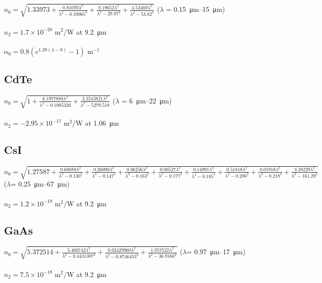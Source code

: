 \documentclass{report}
\begin{document}
\begin{appendices}
\subsection*{}
$n_0=\sqrt{1.33973+\frac{0.81070\lambda^2}{\lambda^2-0.10065^2}+\frac{0.19652\lambda^2}{\lambda^2-29.87^2}+\frac{4.52469\lambda^2}{\lambda^2-53.82^2}}$ (\(\lambda\) = \SIrange{0.15}{15}{\micro\meter}) \cite{Li-1980}\\
\\
$n_2 = 1.7\times 10^{-20}$ m$^2$/W at \SI{9.2}{\micro\meter} \cite{Polyanskiy-2021b}\\
\\
$\alpha_0 = 0.8 (e^{1.20(\lambda-8)}-1)$ m$^{-1}$ \cite{Polyanskiy-2023}

\subsection*{CdTe}
$n_0=\sqrt{1+\frac{6.1977889\lambda^2}{\lambda^2-0.1005326}+\frac{3.2243821\lambda^2}{\lambda^2-5279.518}}$ (\(\lambda\) = \SIrange{6}{22}{\micro\meter}) \cite{DeBell-1979}\\
\\
$n_2 = -2.95\times 10^{-17}$ m$^2$/W at \SI{1.06}{\micro\meter} \cite{Sheik-Bahae-1991}

\subsection*{CsI}
$n_0=\sqrt{1.27587+\frac{0.68689\lambda^2}{\lambda^2-0.130^2}+\frac{0.26090\lambda^2}{\lambda^2-0.147^2}+\frac{0.06256\lambda^2}{\lambda^2-0.163^2}+\frac{0.06527\lambda^2}{\lambda^2-0.177^2}+\frac{0.14991\lambda^2}{\lambda^2-0.185^2}+\frac{0.51818\lambda^2}{\lambda^2-0.206^2}+\frac{0.01918\lambda^2}{\lambda^2-0.218^2}+\frac{3.38229\lambda^2}{\lambda^2-161.29^2}}$ (\(\lambda\)= \SIrange{0.25}{67}{\micro\meter}) \cite{Li-1976}\\
\\
$n_2 = 1.2\times 10^{-19}$ m$^2$/W at \SI{9.2}{\micro\meter} \cite{Polyanskiy-2023}

\subsection*{GaAs}
$n_0=\sqrt{5.372514+\frac{5.466742\lambda^2}{\lambda^2-0.4431307^2}+\frac{0.02429960\lambda^2}{\lambda^2-0.8746453^2}+\frac{1.957522\lambda^2}{\lambda^2-36.9166^2}}$ (\(\lambda\)= \SIrange{0.97}{17}{\micro\meter}) \cite{Skauli-2003}\\
\\
$n_2 = 7.5\times 10^{-18}$ m$^2$/W at \SI{9.2}{\micro\meter} \cite{Polyanskiy-2023}


\end{appendices}
\end{document}
